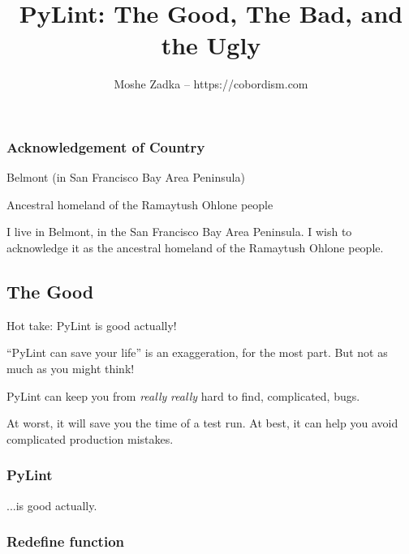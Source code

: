 \usepackage{hyperref}
\usepackage{graphicx}
\usepackage{listings}
\usepackage{textcomp}
\usepackage{fancyvrb}

\newcommand{\passthrough}[1]{\lstset{mathescape=false}#1\lstset{mathescape=true}}
\newcommand{\tightlist}{}

\title{PyLint: The Good, The Bad, and the Ugly}
\author{Moshe Zadka -- https://cobordism.com}
\date{}


\begin{titlepage}
\maketitle
\end{titlepage}

\frame{\titlepage}

\begin{frame}
\frametitle{Acknowledgement of Country}

Belmont (in San Francisco Bay Area Peninsula)

Ancestral homeland of the Ramaytush Ohlone people

\end{frame}

I live in Belmont, in the San Francisco Bay Area Peninsula. I wish to
acknowledge it as the ancestral homeland of the Ramaytush Ohlone people.

\hypertarget{the-good}{%
\subsection{The Good}\label{the-good}}

Hot take: PyLint is good actually!

``PyLint can save your life'' is an exaggeration, for the most part. But
not as much as you might think!

PyLint can keep you from \emph{really} \emph{really} hard to find,
complicated, bugs.

At worst, it will save you the time of a test run. At best, it can help
you avoid complicated production mistakes.

\begin{frame}[fragile]
\frametitle{PyLint}

\pause
...is good actually.
\end{frame}

\hypertarget{redefine-function}{%
\subsubsection{Redefine function}\label{redefine-function}}

